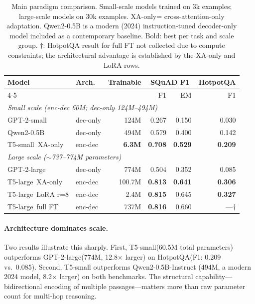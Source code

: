 \documentclass[11pt]{article}
\newcommand{\tssmall}{T5-small\xspace}
\newcommand{\tslarge}{T5-large\xspace}
\newcommand{\gptsmall}{GPT-2-small\xspace}
\newcommand{\gptlarge}{GPT-2-large\xspace}
\newcommand{\qwensmall}{Qwen2-0.5B\xspace}
\newcommand{\xaonly}{XA-only\xspace}
\newcommand{\squad}{SQuAD\xspace}
\newcommand{\hotpotqa}{HotpotQA\xspace}
\begin{document}
\begin{table}[t]
  \centering
  \small
  \caption{Main paradigm comparison. Small-scale models trained on 3k examples;
  large-scale models on 30k examples. \xaonly = cross-attention-only adaptation.
  \qwensmall is a modern (2024) instruction-tuned decoder-only model included as
  a contemporary baseline. Bold: best per task and scale group.
  $\dagger$: HotpotQA result for full FT not collected due to compute constraints;
  the architectural advantage is established by the \xaonly and LoRA rows.}
  \label{tab:main-results}
  \begin{tabular}{llrrrr}
    \toprule
    \multirow{2}{*}{Model} & \multirow{2}{*}{Arch.} &
    \multirow{2}{*}{Trainable} &
    \multicolumn{2}{c}{\squad F1} & HotpotQA \\
    \cmidrule(lr){4-5}
    & & & F1 & EM & F1 \\
    \midrule
    \multicolumn{6}{l}{\emph{Small scale (enc-dec 60M; dec-only 124M--494M)}} \\
    \gptsmall & dec-only & 124M & 0.267 & 0.150 & 0.030 \\
    \qwensmall & dec-only & 494M & 0.579 & 0.400 & 0.142 \\
    \tssmall~\xaonly & enc-dec & \textbf{6.3M} & \textbf{0.708} & \textbf{0.529} & \textbf{0.209} \\
    \midrule
    \multicolumn{6}{l}{\emph{Large scale ($\sim$737--774M parameters)}} \\
    \gptlarge & dec-only & 774M & 0.504 & 0.352 & 0.085 \\
    \tslarge~\xaonly & enc-dec & 100.7M & \textbf{0.813} & \textbf{0.641} & \textbf{0.306} \\
    \tslarge~LoRA r=8 & enc-dec & 2.4M & \textbf{0.815} & 0.645 & \textbf{0.327} \\
    \tslarge~full FT & enc-dec & 737M & \textbf{0.816} & 0.660 & —$\dagger$ \\
    \bottomrule
  \end{tabular}
\end{table}

\paragraph{Architecture dominates scale.}
Two results illustrate this sharply.
First, \tssmall (60.5M total parameters) outperforms \gptlarge (774M, 12.8$\times$
larger) on \hotpotqa (F1: 0.209 vs.\ 0.085).
Second, \tssmall outperforms \qwensmall-Instruct (494M, a modern 2024 model,
8.2$\times$ larger) on both benchmarks.
The structural capability---bidirectional encoding of multiple passages---matters
more than raw parameter count for multi-hop reasoning.
\end{document}
